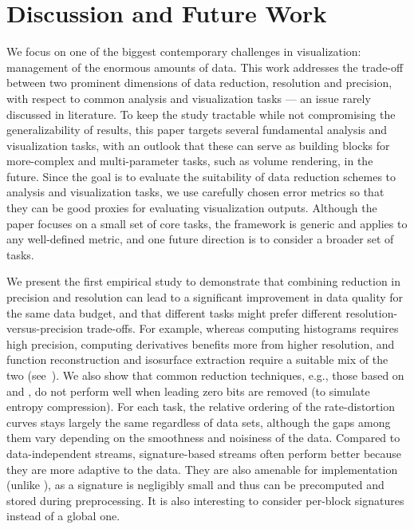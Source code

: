 \section{Discussion and Future Work}

We focus on one of the biggest contemporary challenges in visualization: management of 
the enormous amounts of data. This work addresses the trade-off between two prominent 
dimensions of data reduction, resolution and precision, with respect to 
common analysis and visualization tasks --- 
an issue rarely discussed in literature.
To keep the study tractable while not
compromising the generalizability of results, this paper targets 
several fundamental analysis and visualization tasks, with an outlook that these can serve as building blocks 
for more-complex and multi-parameter tasks, such as volume rendering, in the future.
Since the goal is to evaluate the suitability of data reduction schemes to analysis and 
visualization tasks, we use carefully chosen error metrics 
so that they can be good
proxies for evaluating visualization outputs. Although the paper focuses on a small set of core tasks, the framework is generic and applies to any well-defined metric, and one future direction is to
consider a broader set of tasks.

We present the first empirical study to demonstrate that combining reduction in precision and
resolution can lead to a significant improvement in data quality for the same data budget, and that
different tasks might prefer different resolution-versus-precision trade-offs. For example, whereas
computing histograms requires high precision, computing derivatives benefits more from higher
resolution, and function reconstruction and isosurface extraction require a suitable mix of the two
(see~). We also show that common reduction techniques, e.g., those based on
\slvl and \smag, do not perform well when leading zero bits are removed (to simulate entropy
compression). For each task, the relative ordering of the rate-distortion curves stays
largely the same regardless of data sets, although the gaps among them vary depending on the
smoothness and noisiness of the data. Compared to data-independent streams, signature-based streams
often perform better because they are more adaptive to the data. They are also amenable for
implementation (unlike \sopt), as a signature is negligibly small and thus can be precomputed and
stored during preprocessing. It is also interesting to consider per-block signatures instead of a
global one.

